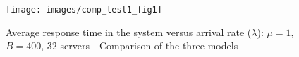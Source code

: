 \documentclass[conference]{IEEEtran}
\begin{document}
\begin{figure}[!ht]
  \centering
  \texttt{[image: images/comp\_test1\_fig1]}
  \caption{Average response time in the system versus arrival rate ($\lambda$): $\mu=1$, $B=400$, $32$ servers - Comparison of the three models -}
  \label{fig:image-chap4-comp_test1_fig1}
\end{figure}
%
%
%
\end{document}
